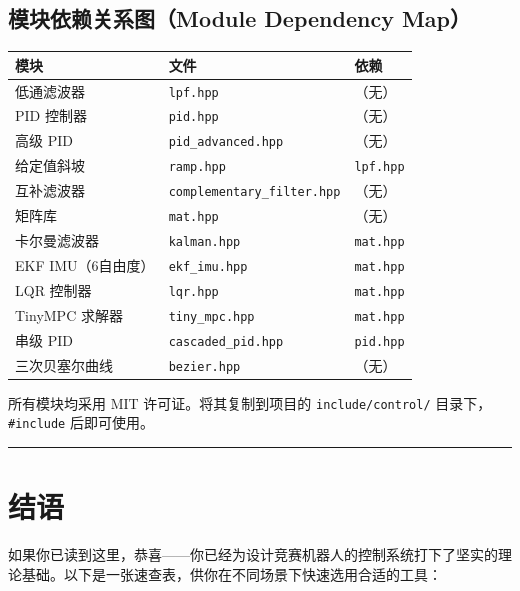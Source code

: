 \subsection{模块依赖关系图（Module Dependency Map）}

\begin{center}
\begin{tabular}{lll}
\toprule
\textbf{模块} & \textbf{文件} & \textbf{依赖} \\
\midrule
低通滤波器 & \texttt{lpf.hpp} & （无） \\
PID 控制器 & \texttt{pid.hpp} & （无） \\
高级 PID & \texttt{pid\_advanced.hpp} & （无） \\
给定值斜坡 & \texttt{ramp.hpp} & \texttt{lpf.hpp} \\
互补滤波器 & \texttt{complementary\_filter.hpp} & （无） \\
矩阵库 & \texttt{mat.hpp} & （无） \\
卡尔曼滤波器 & \texttt{kalman.hpp} & \texttt{mat.hpp} \\
EKF IMU（6自由度） & \texttt{ekf\_imu.hpp} & \texttt{mat.hpp} \\
LQR 控制器 & \texttt{lqr.hpp} & \texttt{mat.hpp} \\
TinyMPC 求解器 & \texttt{tiny\_mpc.hpp} & \texttt{mat.hpp} \\
串级 PID & \texttt{cascaded\_pid.hpp} & \texttt{pid.hpp} \\
三次贝塞尔曲线 & \texttt{bezier.hpp} & （无） \\
\bottomrule
\end{tabular}
\end{center}

所有模块均采用 MIT 许可证。将其复制到项目的 \texttt{include/control/} 目录下，\texttt{\#include} 后即可使用。

\newpage

\vspace{1em}
\hrule
\vspace{1em}

\section*{结语}

如果你已读到这里，恭喜——你已经为设计竞赛机器人的控制系统打下了坚实的理论基础。以下是一张速查表，供你在不同场景下快速选用合适的工具：


